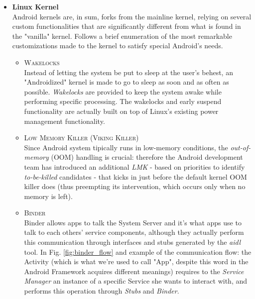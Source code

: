 \begin{itemize}
\item \textbf{Linux Kernel}\\
Android kernels are, in sum, forks from the mainline kernel, relying on several custom 	functionalities that are significantly different from what is found in the "vanilla" kernel. Follows a brief enumeration of the most remarkable customizations made to the kernel to satisfy special Android's needs.
	\begin{itemize}
	\item \textsc{Wakelocks}\\
	Instead of letting the system be put to sleep at the user's behest, an "Androidized"
kernel is made to go to sleep as soon and as often as possible. \textit{Wakelocks} are provided to keep the system awake while performing specific processing. The wakelocks and early suspend functionality are actually built on top of Linux's existing power management functionality.
	\item \textsc{Low Memory Killer (Viking Killer)}\\
	Since Android system tipically runs in low-memory conditions, the \textit{out-of-memory} (OOM) handling is crucial: therefore the Android development team has introduced an additional \textit{LMK} - based on priorities to identify \textit{to-be-killed} candidates - that kicks in just before the default kernel OOM killer does (thus preempting its intervention, which occurs only when no memory is left).
	\item \textsc{Binder}\\
	Binder allows apps to talk the System Server and it's what apps use to talk to each others' service components, although they actually perform this communication through  interfaces and stubs generated by the \textit{aidl} tool. In Fig. \ref{fig:binder_flow} and example of the communication flow: the Activity (which is what we're used to call "App", despite this word in the Android Framework acquires different meanings) requires to the \textit{Service Manager} an instance of a specific Service she wants to interact with, and performs this operation through \textit{Stubs} and \textit{Binder}.
		\begin{figure}[!htb]
			\centering

\end{figure}
\end{itemize}
\end{itemize}
